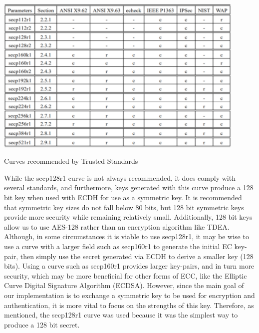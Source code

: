  \begin{table}[t]
	\centering
	\includegraphics[width=12cm,height=0.7\textheight,keepaspectratio]{./figures/table_3}
	\center\caption[font=footnote]{Curves recommended by Trusted Standards}
\end{table}

While the secp128r1 curve is not always recommended, it does comply with several standards, and furthermore, keys generated with this curve produce a 128 bit key when used with ECDH for use as a symmetric key. It is recommended that symmetric key sizes do not fall below 80 bits, but 128 bit symmetric keys provide more security while remaining relatively small. Additionally, 128 bit keys allow us to use AES-128 rather than an encryption algorithm like TDEA. Although, in some circumstances it is viable to use secp128r1, it may be wise to use a curve with a larger field such as secp160r1 to generate the initial EC key-pair, then simply use the secret generated via ECDH to derive a smaller key (128 bits). Using a curve such as secp160r1 provides larger key-pairs, and in turn more security, which may be more beneficial for other forms of ECC, like the Elliptic Curve Digital Signature Algorithm (ECDSA). However, since the main goal of our implementation is to exchange a symmetric key to be used for encryption and authentication, it is more vital to focus on the strengths of this key. Therefore, as mentioned, the secp128r1 curve was used because it was the simplest way to produce a 128 bit secret. 

